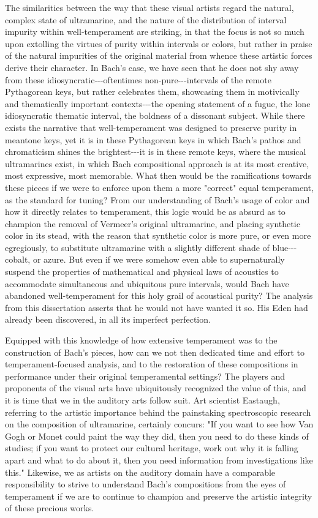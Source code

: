 The similarities between the way that these visual artists regard the
natural, complex state of ultramarine, and the nature of the
distribution of interval impurity within well-temperament are striking,
in that the focus is not so much upon extolling the virtues of purity
within intervals or colors, but rather in praise of the natural
impurities of the original material from whence these artistic forces
derive their character. In Bach's case, we have seen that he does not
shy away from these idiosyncratic-\/-\/-oftentimes
non-pure-\/-\/-intervals of the remote Pythagorean keys, but rather
celebrates them, showcasing them in motivically and thematically
important contexts-\/-\/-the opening statement of a fugue, the lone
idiosyncratic thematic interval, the boldness of a dissonant subject.
While there exists the narrative that well-temperament was designed to
preserve purity in meantone keys, yet it is in these Pythagorean keys in
which Bach's pathos and chromaticism shines the brightest-\/-\/-it is in
these remote keys, where the musical ultramarines exist, in which Bach
compositional approach is at its most creative, most expressive, most
memorable. What then would be the ramifications towards these pieces if
we were to enforce upon them a more "correct" equal temperament, as the
standard for tuning? From our understanding of Bach's usage of color and
how it directly relates to temperament, this logic would be as absurd as
to champion the removal of Vermeer's original ultramarine, and placing
synthetic color in its stead, with the reason that synthetic color is
more pure, or even more egregiously, to substitute ultramarine with a
slightly different shade of blue-\/-\/-cobalt, or azure. But even if we
were somehow even able to supernaturally suspend the properties of
mathematical and physical laws of acoustics to accommodate simultaneous
and ubiquitous pure intervals, would Bach have abandoned
well-temperament for this holy grail of acoustical purity? The analysis
from this dissertation asserts that he would not have wanted it so. His
Eden had already been discovered, in all its imperfect perfection.

Equipped with this knowledge of how extensive temperament was to the
construction of Bach's pieces, how can we not then dedicated time and
effort to temperament-focused analysis, and to the restoration of these
compositions in performance under their original temperamental settings?
The players and proponents of the visual arts have ubiquitously
recognized the value of this, and it is time that we in the auditory
arts follow suit. Art scientist Eastaugh, referring to the artistic
importance behind the painstaking spectroscopic research on the
composition of ultramarine, certainly concurs: "If you want to see how
Van Gogh or Monet could paint the way they did, then you need to do
these kinds of studies; if you want to protect our cultural heritage,
work out why it is falling apart and what to do about it, then you need
information from investigations like this." Likewise, we as artists on
the auditory domain have a comparable responsibility to strive to
understand Bach's compositions from the eyes of temperament if we are to
continue to champion and preserve the artistic integrity of these
precious works.

